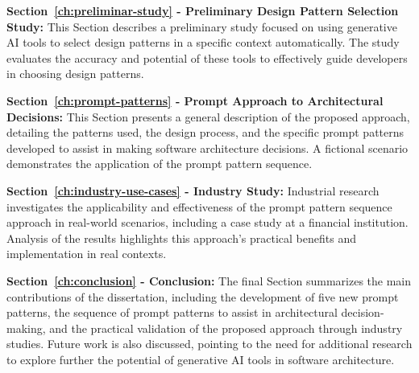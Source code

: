 \textbf{Section~\ref{ch:preliminar-study} - Preliminary Design Pattern Selection Study: }This Section describes a preliminary study focused on using generative AI tools to select design patterns in a specific context automatically. The study evaluates the accuracy and potential of these tools to effectively guide developers in choosing design patterns.

\textbf{Section~\ref{ch:prompt-patterns} - Prompt Approach to Architectural Decisions: } This Section presents a general description of the proposed approach, detailing the patterns used, the design process, and the specific prompt patterns developed to assist in making software architecture decisions. A fictional scenario demonstrates the application of the prompt pattern sequence.

\textbf{Section~\ref{ch:industry-use-cases} - Industry Study: }
Industrial research investigates the applicability and effectiveness of the prompt pattern sequence approach in real-world scenarios, including a case study at a financial institution. Analysis of the results highlights this approach's practical benefits and implementation in real contexts.

\textbf{Section~\ref{ch:conclusion} - Conclusion: }
The final Section summarizes the main contributions of the dissertation, including the development of five new prompt patterns, the sequence of prompt patterns to assist in architectural decision-making, and the practical validation of the proposed approach through industry studies. Future work is also discussed, pointing to the need for additional research to explore further the potential of generative AI tools in software architecture.
